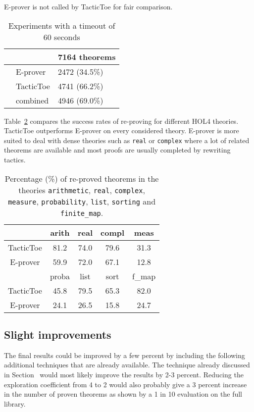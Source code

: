 \documentclass[runningheads,a4paper,draft]{svjour3}
\def\holfour{\textsf{HOL4}\xspace}
\def\eprover{\textsf{E-prover}\xspace}
\def\tactictoe{\textsf{TacticToe}\xspace}
\newcommand{\ra}[1]{\renewcommand{\arraystretch}{#1}}
\begin{document}
\eprover is not called by \tactictoe for fair comparison.



\begin{table}[h!]
\centering\ra{1.3}
\small
\begin{tabular}{lll}
\toprule
  & & 7164 theorems \\
\midrule
  & \eprover   & 2472 (34.5\%)\\ 
  & \tactictoe & 4741 (66.2\%)\\
  & combined   & 4946 (69.0\%)\\
\bottomrule
\end{tabular}
\caption{Experiments with a timeout of 60 seconds \label{tab:_param}}
\end{table}

Table~\ref{theories} compares the success rates of re-proving for different
\holfour theories. \tactictoe outperforms \eprover on every 
considered theory.
\eprover is more suited to deal with dense theories such as 
\texttt{real} or \texttt{complex} where a lot of related theorems are available 
and most proofs are usually completed by rewriting tactics.

\begin{table}[]
\centering
\setlength{\tabcolsep}{3mm}
\begin{tabular}{@{}ccccc@{}}
\toprule
\phantom{ab} & {arith} & {real} & {compl} & {meas} \\
\midrule
\tactictoe & 81.2 & 74.0 & 79.6 & 31.3\\
\eprover & 59.9 & 72.0 & 67.1 & 12.8\\
\midrule
\phantom{abc} & {proba} & {list} & {sort} & {f\_map} \\
\midrule
\tactictoe & 45.8 & 79.5 & 65.3 & 82.0 \\
\eprover & 24.1 & 26.5 & 15.8 & 24.7 \\
\bottomrule
\end{tabular}
\caption{\label{theories}Percentage (\%) of re-proved theorems in the theories 
\texttt{arithmetic}, \texttt{real}, \texttt{complex}, \texttt{measure},  
\texttt{probability}, \texttt{list}, \texttt{sorting} and \texttt{finite\_map}. 
}
\end{table}  



\subsection{Slight improvements}
The final results could be improved by a few percent by including the 
following additional techniques that are already available.
The technique already discussed in Section~ would most likely improve the 
results by 2-3 percent. Reducing the exploration coefficient from 4 to 2 would 
also probably give a 3 percent increase in the number of proven theorems as 
shown by a 1 in 10 evaluation on the full library.
\end{document}
